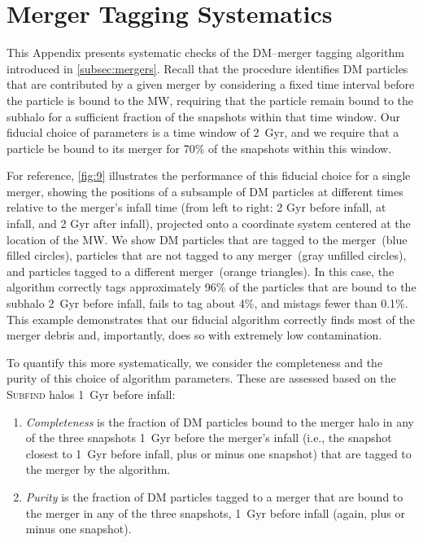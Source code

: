 \documentclass[twocolumn,tighten,twocolappendix]{aastex701}
\newcommand{\subfind}{\textsc{Subfind}}
\begin{document}
\appendix
\section{Merger Tagging Systematics} \label{appendix:merger_association}


This Appendix presents systematic checks of the DM--merger tagging algorithm introduced in \autoref{subsec:mergers}. Recall that the procedure identifies DM particles that are contributed by a given merger by considering a fixed time interval before the particle is bound to the MW, requiring that the particle remain bound to the subhalo for a sufficient fraction of the snapshots within that time window. Our fiducial choice of parameters is a time window of 2~Gyr, and we require that a particle be bound to its merger for 70\% of the snapshots within this window.

For reference, \autoref{fig:9} illustrates the performance of this fiducial choice for a single merger, showing the positions of a subsample of DM particles at different times relative to the merger's infall time (from left to right: 2 Gyr before infall, at infall, and 2 Gyr after infall), projected onto a coordinate system centered at the location of the MW. We show DM particles that are tagged to the merger~(blue filled circles), particles that are not tagged to any merger~(gray unfilled circles), and particles tagged to a different merger~(orange triangles). In this case, the algorithm correctly tags approximately 96\% of the particles that are bound to the subhalo 2~Gyr before infall, fails to tag about 4\%, and mistags fewer than 0.1\%. This example demonstrates that our fiducial algorithm correctly finds most of the merger debris and, importantly, does so with extremely low contamination. 

To quantify this more systematically, we consider the completeness and the purity of this choice of algorithm parameters. These are assessed  based on the \subfind{} halos 1~Gyr before infall:
\begin{enumerate}[wide=0pt, leftmargin=\parindent]
    \item \textit{Completeness} is the fraction of DM particles bound to the merger halo in any of the three snapshots 1~Gyr before the merger's infall (i.e., the snapshot closest to 1~Gyr before infall, plus or minus one snapshot) that are tagged to the merger by the algorithm.
    \item \textit{Purity} is the fraction of DM particles tagged to a merger that are bound to the merger in any of the three snapshots, 1~Gyr before infall (again, plus or minus one snapshot).
\end{enumerate}
\end{document}
